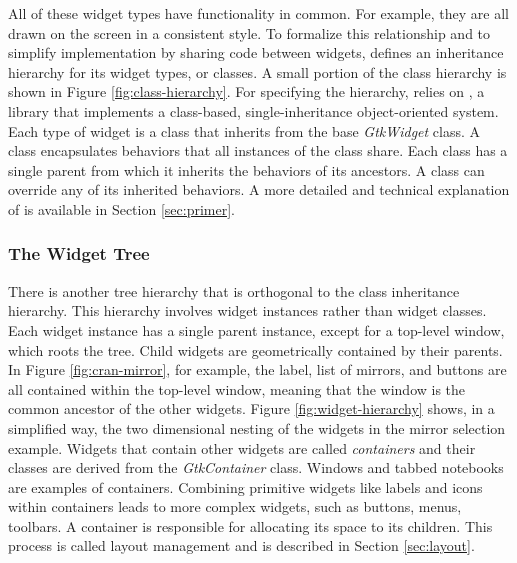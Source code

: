 \documentclass[article]{jss}
\begin{document}
All of these widget types have functionality in common. For example, they are
all drawn on the screen in a consistent style. To formalize this relationship 
and to simplify implementation by sharing code
between widgets,  defines an inheritance hierarchy for its widget
types, or classes. A small portion of the  class hierarchy is shown
in Figure \ref{fig:class-hierarchy}. For specifying the hierarchy,  
relies on , a  library that implements a class-based, single-inheritance 
object-oriented system.  Each type of  widget is a  
class that inherits from the base \emph{GtkWidget} class. A  
class encapsulates behaviors that all instances of the class share. 
Each class has a single parent from which it inherits 
the behaviors of its ancestors. A class can override any of its inherited behaviors.
A more detailed and technical explanation of  is available in 
Section \ref{sec:primer}. 

\subsubsection{The Widget Tree}

There is another tree hierarchy that is orthogonal to the 
class inheritance hierarchy. This hierarchy involves widget instances rather
than widget classes. Each widget instance has a single parent instance, except
for a top-level window, which roots the tree. Child widgets are geometrically
contained by their parents. In Figure \ref{fig:cran-mirror}, 
for example, the label, list of mirrors, and buttons are all contained within the 
top-level window, meaning that the window is the common ancestor of the other widgets.
Figure \ref{fig:widget-hierarchy} shows, in a simplified way, the two dimensional
nesting of the widgets in the mirror selection example. Widgets that contain 
other widgets are called \emph{containers} and their classes are derived from 
the \emph{GtkContainer} class. Windows and tabbed notebooks are examples of containers.
Combining primitive widgets like labels and icons within containers
leads to more complex widgets, such as buttons, menus, toolbars. A container is 
responsible for allocating its space to its children. This process is called
layout management and is described in Section \ref{sec:layout}.
\end{document}
